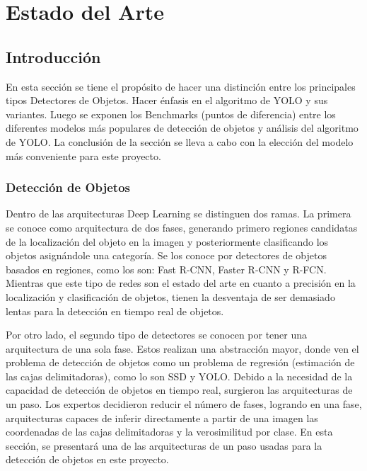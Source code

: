\chapter{Estado del Arte}
\label{Estado del Arte - YOLO}



\section{Introducción}
En esta sección se tiene el propósito de hacer una distinción entre los principales tipos Detectores de Objetos. Hacer énfasis en el algoritmo de YOLO y sus variantes. Luego se exponen los Benchmarks (puntos de diferencia) entre los diferentes modelos más populares de detección de objetos y análisis del algoritmo de YOLO. La conclusión de la sección se lleva a cabo con la elección del modelo más conveniente para este proyecto.

\subsection{Detección de Objetos}

Dentro de las arquitecturas Deep Learning se distinguen dos ramas. La primera se conoce como arquitectura de dos fases, generando primero regiones candidatas de la localización del objeto en la imagen y posteriormente clasificando los objetos asignándole una categoría. Se los conoce por detectores de objetos basados en regiones, como los son: Fast R-CNN, Faster R-CNN y R-FCN. Mientras que este tipo de redes son el estado del arte en cuanto a precisión en la localización y clasificación de objetos, tienen la desventaja de ser demasiado lentas para la detección en tiempo real de objetos.

Por otro lado, el segundo tipo de detectores se conocen por tener una arquitectura de una sola fase. Estos realizan una abstracción mayor, donde ven el problema de detección de objetos como un problema de regresión (estimación de las cajas delimitadoras), como lo son SSD y YOLO. Debido a la necesidad de la capacidad de detección de objetos en tiempo real, surgieron las arquitecturas de un paso. Los expertos decidieron reducir el número de fases, logrando en una fase, arquitecturas capaces de inferir directamente a partir de una imagen las coordenadas de las cajas delimitadoras y la verosimilitud por clase. En esta sección, se presentará una de las arquitecturas de un paso usadas
para la detección de objetos en este proyecto.

